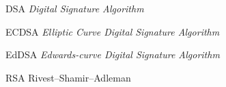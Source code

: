 \begin{siglas}
  \item[DSA] \textit{Digital Signature Algorithm}
  \item[ECDSA] \textit{Elliptic Curve Digital Signature Algorithm}
  \item[EdDSA] \textit{Edwards-curve Digital Signature Algorithm}
  \item[RSA] Rivest–Shamir–Adleman
\end{siglas}
